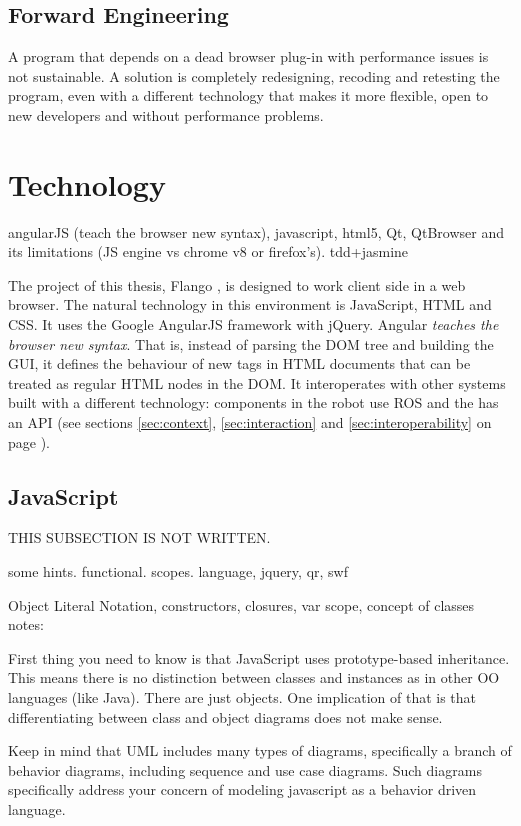 \subsection{Forward Engineering} A program that depends on a dead browser plug-in with performance issues is not sustainable.
A solution is completely  redesigning, recoding and retesting the program, even with a different technology that makes it more flexible, open to new developers and without performance problems.


\section{Technology}
angularJS (teach the browser new syntax), javascript, html5, Qt, QtBrowser and its limitations (JS engine vs chrome v8 or firefox's). tdd+jasmine

The project of this thesis, Flango \cm, is designed to work client side in a web browser.
The natural technology in this environment is JavaScript, HTML and CSS.
It uses the Google AngularJS framework with jQuery.
Angular \textit{teaches the browser new syntax}.
That is, instead of parsing the \ac{DOM} tree and building the \ac{GUI}, it defines the behaviour of new tags in \ac{HTML} documents that can be treated as regular \ac{HTML} nodes in the \ac{DOM}.
It interoperates with other systems built with a different technology: components in the robot use \ac{ROS} and the \flangobe has an \ac{API} (see sections \ref{sec:context}, \ref{sec:interaction} and \ref{sec:interoperability} on page \pageref{sec:context}).

\subsection{JavaScript}
THIS SUBSECTION  IS NOT WRITTEN.

some hints. functional. scopes.
language, jquery, qr, swf

Object Literal Notation, constructors, closures, var scope, concept of classes
notes:

First thing you need to know is that JavaScript uses prototype-based inheritance. This means there is no distinction between classes and instances as in other OO languages (like Java). There are just objects. One implication of that is that differentiating between class and object diagrams does not make sense.

Keep in mind that UML includes many types of diagrams, specifically a branch of behavior diagrams, including sequence and use case diagrams. Such diagrams specifically address your concern of modeling javascript as a behavior driven language.

